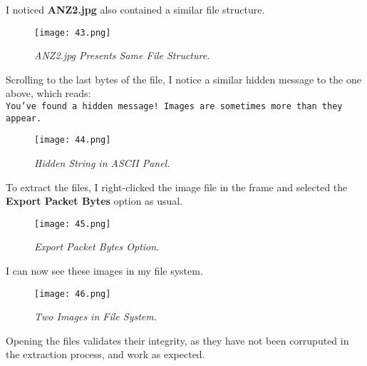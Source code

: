I noticed \textbf{ANZ2.jpg} also contained a similar file structure.

\begin{figure}[H]
    \setlength{\abovecaptionskip}{20pt}
    \setlength{\belowcaptionskip}{0pt}
    \centering
    \texttt{[image: 43.png]}
    \captionsetup{justification=centering}
    \caption{\textit{ANZ2.jpg Presents Same File Structure.}}
    \label{fig:43}
\end{figure}
\vspace{-10pt}

Scrolling to the last bytes of the file, I notice a similar hidden message to the one above, which reads:\\
\texttt{You've found a hidden message! Images are sometimes more than they appear.}

\begin{figure}[H]
    \setlength{\abovecaptionskip}{20pt}
    \setlength{\belowcaptionskip}{0pt}
    \centering
    \texttt{[image: 44.png]}
    \captionsetup{justification=centering}
    \caption{\textit{Hidden String in ASCII Panel.}}
    \label{fig:44}
\end{figure}
\vspace{-10pt}

To extract the files, I right-clicked the image file in the frame and selected the \textbf{Export Packet Bytes} option as usual.

\begin{figure}[H]
    \setlength{\abovecaptionskip}{20pt}
    \setlength{\belowcaptionskip}{0pt}
    \centering
    \texttt{[image: 45.png]}
    \captionsetup{justification=centering}
    \caption{\textit{Export Packet Bytes Option.}}
    \label{fig:45}
\end{figure}
\vspace{-10pt}

I can now see these images in my file system.

\begin{figure}[H]
    \setlength{\abovecaptionskip}{20pt}
    \setlength{\belowcaptionskip}{0pt}
    \centering
    \texttt{[image: 46.png]}
    \captionsetup{justification=centering}
    \caption{\textit{Two Images in File System.}}
    \label{fig:46}
\end{figure}
\vspace{-10pt}

Opening the files validates their integrity, as they have not been corruputed in the extraction process, and work as expected.

